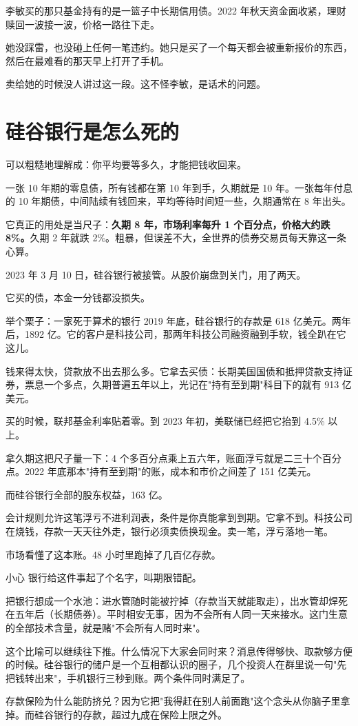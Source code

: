 李敏买的那只基金持有的是一篮子中长期信用债。2022 年秋天资金面收紧，理财赎回一波接一波，价格一路往下走。

她没踩雷，也没碰上任何一笔违约。她只是买了一个每天都会被重新报价的东西，然后在最难看的那天早上打开了手机。

卖给她的时候没人讲过这一段。这不怪李敏，是话术的问题。

\section{硅谷银行是怎么死的}

可以粗糙地理解成：你平均要等多久，才能把钱收回来。

一张 10 年期的零息债，所有钱都在第 10 年到手，久期就是 10 年。一张每年付息的 10 年期债，中间陆续有钱回来，平均等待时间短一些，久期通常在 8 年出头。

它真正的用处是当尺子：\textbf{久期 8 年，市场利率每升 1 个百分点，价格大约跌 8\%。}久期 2 年就跌 2\%。粗暴，但误差不大，全世界的债券交易员每天靠这一条心算。

2023 年 3 月 10 日，硅谷银行被接管。从股价崩盘到关门，用了两天。

它买的债，本金一分钱都没损失。

\begin{egbox}{举个栗子：一家死于算术的银行}
2019 年底，硅谷银行的存款是 618 亿美元。两年后，1892 亿。它的客户是科技公司，那两年科技公司融资融到手软，钱全趴在它这儿。

钱来得太快，贷款放不出去那么多。它拿去买债：长期美国国债和抵押贷款支持证券，票息一个多点，久期普遍五年以上，光记在"持有至到期"科目下的就有 913 亿美元。

买的时候，联邦基金利率贴着零。到 2023 年初，美联储已经把它抬到 4.5\% 以上。

拿久期这把尺子量一下：4 个多百分点乘上五六年，账面浮亏就是二三十个百分点。2022 年底那本"持有至到期"的账，成本和市价之间差了 151 亿美元。

而硅谷银行全部的股东权益，163 亿。

会计规则允许这笔浮亏不进利润表，条件是你真能拿到到期。它拿不到。科技公司在烧钱，存款一天天往外走，银行必须卖债换现金。卖一笔，浮亏落地一笔。

市场看懂了这本账。48 小时里跑掉了几百亿存款。

\end{egbox}

\begin{warnbox}{小心}
银行给这件事起了个名字，叫期限错配。

把银行想成一个水池：进水管随时能被拧掉（存款当天就能取走），出水管却焊死在五年后（长期债券）。平时相安无事，因为不会所有人同一天来接水。这门生意的全部技术含量，就是赌"不会所有人同时来"。

这个比喻可以继续往下推。什么情况下大家会同时来？消息传得够快、取款够方便的时候。硅谷银行的储户是一个互相都认识的圈子，几个投资人在群里说一句"先把钱转出来"，手机银行三秒到账。两个条件同时满足了。

存款保险为什么能防挤兑？因为它把"我得赶在别人前面跑"这个念头从你脑子里拿掉。而硅谷银行的存款，超过九成在保险上限之外。

\end{warnbox}

